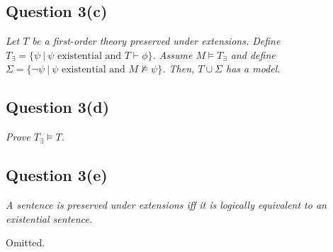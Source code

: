 \documentclass[a4paper]{article}
\begin{document}
\subsection*{Question 3(c)}
\begin{center}
  \textit{Let $T$ be a first-order theory preserved under extensions. Define
    $T_\exists = \{\psi ~|~ \psi\text{ existential and } T \vdash \phi\}$.
    Assume $M \models T_\exists$ and define $\Sigma = \{ \neg \psi ~|~ \psi\text{ existential and }M \nvDash \psi\}$. Then, $T \cup \Sigma$ has a model.
  }
\end{center}
\subsection*{Question 3(d)}
\begin{center}
  \textit{Prove $T_\exists \models T$.}
\end{center}
\subsection*{Question 3(e)}
\begin{center}
  \textit{A sentence is preserved under extensions iff
  it is logically equivalent to an existential sentence.}
\end{center}
Omitted.
\end{document}

